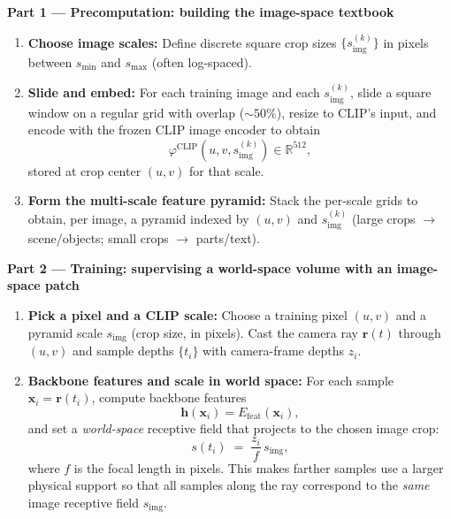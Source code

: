 \begin{enrichment}
\begin{enrichment}
        \textbf{Part 1 — Precomputation: building the image-space textbook}
        \medskip
        \begin{enumerate}
            \item \textbf{Choose image scales:} Define discrete square crop sizes $\{s_{\text{img}}^{(k)}\}$ in pixels between $s_{\min}$ and $s_{\max}$ (often log-spaced).
            \item \textbf{Slide and embed:} For each training image and each $s_{\text{img}}^{(k)}$, slide a square window on a regular grid with overlap ($\sim50\%$), resize to CLIP’s input, and encode with the frozen CLIP image encoder to obtain
            \[
            \varphi^{\text{CLIP}}(u,v,s_{\text{img}}^{(k)}) \in \mathbb{R}^{512},
            \]
            stored at crop center $(u,v)$ for that scale.
            \item \textbf{Form the multi-scale feature pyramid:} Stack the per-scale grids to obtain, per image, a pyramid indexed by $(u,v)$ and $s_{\text{img}}^{(k)}$ (large crops $\to$ scene/objects; small crops $\to$ parts/text).
        \end{enumerate}
        
        \newpage
        
        \textbf{Part 2 — Training: supervising a world-space volume with an image-space patch}
        \medskip
        \begin{enumerate}
            \item \textbf{Pick a pixel and a CLIP scale:} Choose a training pixel $(u,v)$ and a pyramid scale $s_{\text{img}}$ (crop size, in pixels). Cast the camera ray $\mathbf{r}(t)$ through $(u,v)$ and sample depths $\{t_i\}$ with camera-frame depths $z_i$.
            
            \item \textbf{Backbone features and scale in world space:} For each sample $\mathbf{x}_i=\mathbf{r}(t_i)$, compute backbone features
            \[
            \mathbf{h}(\mathbf{x}_i)=E_{\text{feat}}(\mathbf{x}_i),
            \]
            and set a \emph{world-space} receptive field that projects to the chosen image crop:
            \[
            s(t_i) \;=\; \frac{z_i}{f}\,s_{\text{img}},
            \]
            where $f$ is the focal length in pixels. This makes farther samples use a larger physical support so that all samples along the ray correspond to the \emph{same} image receptive field $s_{\text{img}}$.
            

\end{enumerate}
\end{enrichment}
\end{enrichment}
